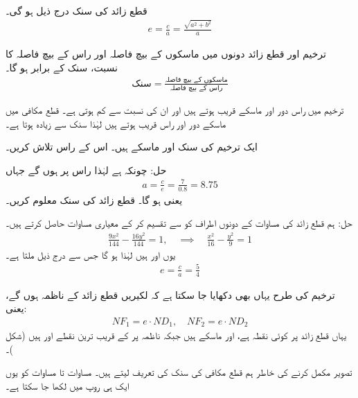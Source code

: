 قطع زائد  کی سنک درج ذیل ہو گی۔
\begin{align*}
e=\frac{c}{a}=\frac{\sqrt{a^2+b^2}}{a}
\end{align*}

ترخیم اور قطع زائد دونوں میں ماسکوں کے بیچ فاصلہ اور راس کے بیچ فاصلہ کا نسبت، سنک کے برابر ہو گا۔
\begin{align*}
\text{سنک}=\frac{\text{ماسکوں کے بیچ فاصلہ}}{\text{راس کے بیچ فاصلہ}}
\end{align*}  

ترخیم میں راس دور اور ماسکے قریب ہوتے ہیں اور ان کی نسبت  سے کم ہوتی ہے۔ قطع مکافی میں ماسکے دور اور راس قریب ہوتے ہیں لہٰذا سنک  سے زیادہ ہوتا ہے۔ 

ایک ترخیم کی سنک  اور ماسکے  ہیں۔ اس کے راس تلاش کریں۔

حل:\quad
چونکہ  ہے لہٰذا راس  پر ہوں گے جہاں
\begin{align*}
a=\frac{c}{e}=\frac{7}{0.8}=8.75
\end{align*}
یعنی  ہو گا۔
قطع زائد  کی سنک معلوم کریں۔

حل:\quad
ہم قطع زائد کی مساوات کے دونوں اطراف کو  سے تقسیم کر کے معیاری مساوات حاصل کرتے ہیں۔
\begin{align*}
\frac{9x^2}{144}-\frac{16y^2}{144}=1,\quad \implies \quad \frac{x^2}{16}-\frac{y^2}{9}=1
\end{align*}
یوں  اور  ہیں  لہٰذا  ہو گا جس سے درج ذیل ملتا ہے۔
\begin{align*}
e=\frac{c}{a}=\frac{5}{4}
\end{align*}

ترخیم کی طرح یہاں بھی دکھایا جا سکتا ہے کہ لکیریں  قطع زائد کے ناظمہ ہوں گے، یعنی:
\begin{align}\label{مساوات_مخروط_قطع_زائد_ناظمہ_ماسکہ_خاصیت}
NF_1=e\cdot ND_1,\quad NF_2=e\cdot ND_2
\end{align}
یہاں قطع زائد پر  کوئی نقطہ ہے،  اور  ماسکے ہیں جبکہ  ناظمہ پر  کے قریب ترین نقطے   اور  ہیں (شکل )۔ 

تصویر مکمل کرنے کی خاطر ہم قطع مکافی کی سنک کی تعریف  لیتے ہیں۔ مساوات  تا مساوات  کو یوں ایک ہی روپ  میں لکھا جا سکتا ہے۔


